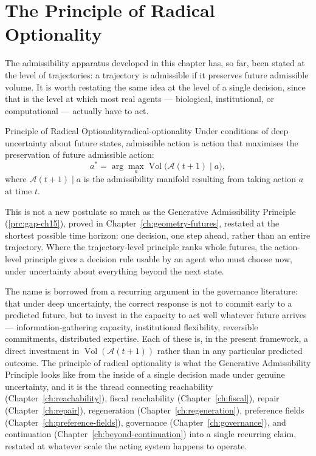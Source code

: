 \documentclass[12pt,twoside,openright]{book}
\newcommand{\adm}{\mathcal{A}}
\newcommand{\Vol}{\operatorname{Vol}}
\begin{document}
\section{The Principle of Radical Optionality}
\label{sec:ch14-radical-optionality}

The admissibility apparatus developed in this chapter has,
so far, been stated at the level of trajectories: a
trajectory is admissible if it preserves future admissible
volume. It is worth restating the same idea at the level of
a single decision, since that is the level at which most
real agents --- biological, institutional, or computational
--- actually have to act.

\begin{principle}{Principle of Radical Optionality}{radical-optionality}
  Under conditions of deep uncertainty about future states,
  admissible action is action that maximises the preservation
  of future admissible action:
  \[
    a^* = \arg\max_a \Vol\bigl(\adm(t+1) \mid a\bigr),
  \]
  where $\adm(t+1)\mid a$ is the admissibility manifold
  resulting from taking action $a$ at time $t$.
\end{principle}

This is not a new postulate so much as the Generative
Admissibility Principle (\cref{prc:gap-ch15}), proved in
Chapter~\ref{ch:geometry-futures}, restated at the shortest
possible time horizon: one decision, one step ahead, rather
than an entire trajectory. Where the trajectory-level
principle ranks whole futures, the action-level principle
gives a decision rule usable by an agent who must choose now,
under uncertainty about everything beyond the next state.

The name is borrowed from a recurring argument in the
governance literature: that under deep uncertainty, the
correct response is not to commit early to a predicted
future, but to invest in the capacity to act well whatever
future arrives --- information-gathering capacity,
institutional flexibility, reversible commitments,
distributed expertise. Each of these is, in the present
framework, a direct investment in $\Vol(\adm(t+1))$ rather
than in any particular predicted outcome. The principle of
radical optionality is what the Generative Admissibility
Principle looks like from the inside of a single decision
made under genuine uncertainty, and it is the thread
connecting reachability (Chapter~\ref{ch:reachability}),
fiscal reachability (Chapter~\ref{ch:fiscal}), repair
(Chapter~\ref{ch:repair}), regeneration
(Chapter~\ref{ch:regeneration}), preference fields
(Chapter~\ref{ch:preference-fields}), governance
(Chapter~\ref{ch:governance}), and continuation
(Chapter~\ref{ch:beyond-continuation}) into a single
recurring claim, restated at whatever scale the acting
system happens to operate.
\end{document}
